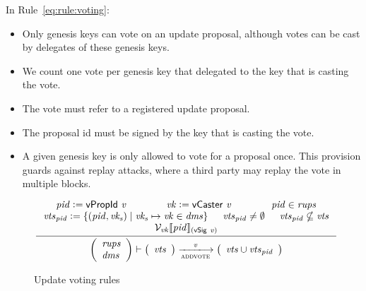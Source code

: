 In Rule~\ref{eq:rule:voting}:
\begin{itemize}
\item Only genesis keys can vote on an update proposal, although votes can be
  cast by delegates of these genesis keys.
\item We count one vote per genesis key that delegated to the key that is
  casting the vote.
\item The vote must refer to a registered update proposal.
\item The proposal id must be signed by the key that is casting the vote.
\item A given genesis key is only allowed to vote for a proposal once. This
  provision guards against replay attacks, where a third party may replay the
  vote in multiple blocks.
\end{itemize}

\begin{figure}[htb]
  \begin{equation}
    \label{eq:rule:voting}
    \inference
    {
      \var{pid} \leteq \vPropId{v} & \var{vk} \leteq \vCaster{v} & \var{pid} \in \var{rups}\\
      \var{vts}_{\var{pid}} \leteq
      \{ (\var{pid}, \var{vk_s}) \mid \var{vk_s} \mapsto \var{vk} \in \var{dms} \} &
      \var{vts}_{\var{pid}} \neq \emptyset &
      \var{vts}_{\var{pid}} \nsubseteq \var{vts} \\
      \mathcal{V}_{\var{vk}}\serialised{\var{pid}}_{(\vSig{v})}\\
    }
    {
      {\left(
        \begin{array}{l}
          \var{rups}\\
          \var{dms}
        \end{array}
      \right)}
      \vdash
      {
        \left(
          \begin{array}{l}
            \var{vts}
          \end{array}
        \right)
      }
      \trans{addvote}{\var{v}}
      {
        \left(
          \begin{array}{l}
            \var{vts} \cup \var{vts}_{\var{pid}}\\
          \end{array}
        \right)
      }
    }
  \end{equation}
  \caption{Update voting rules}
  \label{fig:rules:voting}
\end{figure}

\clearpage

